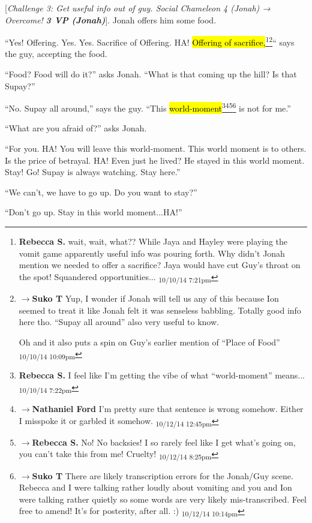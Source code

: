 {[}\textit{Challenge 3: Get useful info out of guy.  Social Chameleon 4 (Jonah) → Overcome! }\textit{\textbf{3 VP (Jonah)}}{]}.  Jonah offers him some food.

``Yes!  Offering.  Yes.  Yes.  Sacrifice of Offering.  HA! \hl{Offering of sacrifice,}\footnote{\textbf{Rebecca S. }wait, wait, what?? While Jaya and Hayley were playing the vomit game apparently useful info was pouring forth.  Why didn't Jonah mention we needed to offer a sacrifice? Jaya would have cut Guy's throat on the spot! 
Squandered opportunities... \textsubscript{10/10/14 7:21pm}}\footnote{$\rightarrow$\textbf{Suko T }Yup, I wonder if Jonah will tell us any of this because Ion seemed to treat it like Jonah felt it was senseless babbling.  Totally good info here tho.  ``Supay all around'' also very useful to know.

Oh and it also puts a spin on Guy's earlier mention of ``Place of Food'' \textsubscript{10/10/14 10:09pm}}`` says the guy, accepting the food.

``Food?  Food will do it?'' asks Jonah.   ``What is that coming up the hill?  Is that Supay?''

``No.  Supay all around,'' says the guy.  ``This \hl{world-moment}\footnote{\textbf{Rebecca S. }I feel like I'm getting the vibe of what ``world-moment'' means... \textsubscript{10/10/14 7:22pm}}\footnote{$\rightarrow$\textbf{Nathaniel Ford }I'm pretty sure that sentence is wrong somehow. Either I misspoke it or garbled it somehow. \textsubscript{10/12/14 12:45pm}}\footnote{$\rightarrow$\textbf{Rebecca S. }No! No backsies! I so rarely feel like I get what's going on, you can't take this from me! Cruelty! \textsubscript{10/12/14 8:25pm}}\footnote{$\rightarrow$\textbf{Suko T }There are likely transcription errors for the Jonah/Guy scene.  Rebecca and I were talking rather loudly about vomiting and you and Ion were talking rather quietly so some words are very likely mis-transcribed.  Feel free to amend!  It's for posterity, after all. :) \textsubscript{10/12/14 10:14pm}} is not for me.''

``What are you afraid of?'' asks Jonah.

``For you.  HA!  You will leave this world-moment.  This world moment is to others.  Is the price of betrayal.  HA!  Even just he lived?  He stayed in this world moment.  Stay!   Go!   Supay is always watching.  Stay here.''

``We can't, we have to go up.  Do you want to stay?''

``Don't go up.  Stay in this world moment...HA!''

